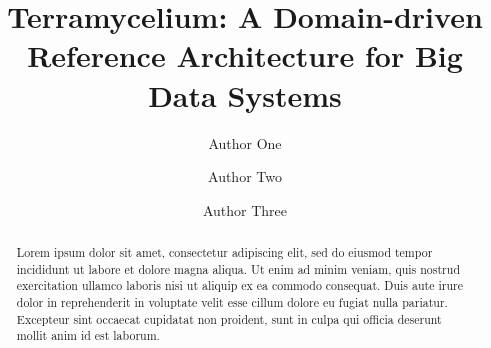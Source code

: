 \documentclass[preprint,12pt]{elsarticle}
\begin{document}
\begin{frontmatter}



\title{Terramycelium: A Domain-driven Reference Architecture for Big Data Systems}


\author[inst1]{Author One}


\author[inst2]{Author Two}
\author[inst1,inst2]{Author Three}


\begin{abstract}
Lorem ipsum dolor sit amet, consectetur adipiscing elit, sed do eiusmod tempor incididunt ut labore et dolore magna aliqua. Ut enim ad minim veniam, quis nostrud exercitation ullamco laboris nisi ut aliquip ex ea commodo consequat. Duis aute irure dolor in reprehenderit in voluptate velit esse cillum dolore eu fugiat nulla pariatur. Excepteur sint occaecat cupidatat non proident, sunt in culpa qui officia deserunt mollit anim id est laborum.
\end{abstract}


\end{frontmatter}
\end{document}
